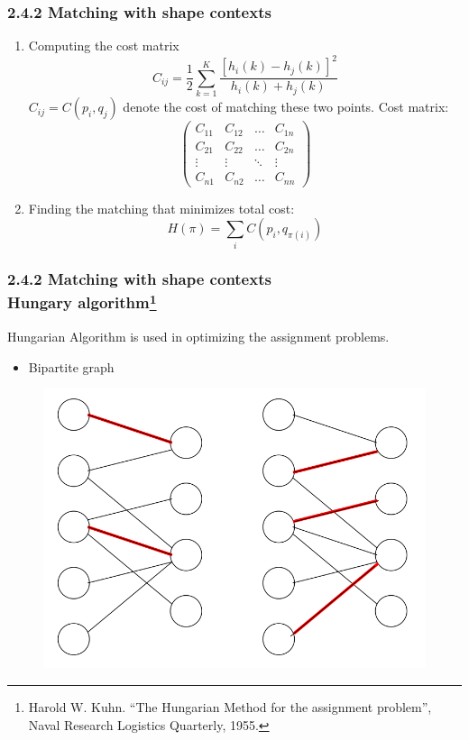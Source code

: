 \documentclass[notheorems,serif,table,compress]{beamer}  %
\begin{document}
\begin{frame}
\frametitle{2.4.2 Matching with shape contexts}
\begin{enumerate}
    \item Computing the cost matrix
    \begin{displaymath}
         C_{ij}=\frac{1}{2}\sum_{k=1}^{K}\frac{[h_{i}(k)-h_{j}(k)]^{2}}{h_{i}(k)+h_{j}(k)}
       \end{displaymath}
       $C_{ij}=C(p_{i},q_{j})$ denote the cost of matching these two points.\newline
   {\color{blue}Cost matrix}:
        \begin{displaymath}
        \left( \begin{array}{cccc}
        C_{11} & C_{12} & \ldots & C_{1n} \\
        C_{21} & C_{22} & \ldots & C_{2n} \\
        \vdots & \vdots & \ddots & \vdots \\
        C_{n1} & C_{n2} & \ldots & C_{nn}
        \end{array} \right)
        \end{displaymath}
    \item Finding the matching that minimizes total cost:
        \begin{displaymath}
        H(\pi)=\sum_{i}C(p_{i},q_{\pi(i)})
        \end{displaymath}
    \end{enumerate}
\end{frame}


\begin{frame}
\frametitle{2.4.2 Matching with shape contexts \\ \normalsize{Hungary algorithm\footnote{Harold W. Kuhn. ``The Hungarian Method for the assignment problem'', Naval Research Logistics Quarterly, 1955.}}}
Hungarian Algorithm is used in optimizing the assignment problems.\newline

\begin{itemize}
    \item Bipartite graph
\end{itemize}
    \begin{figure}
    \includegraphics[width=0.5\linewidth]{xiong} 
    \end{figure}
\end{frame}
\end{document}

